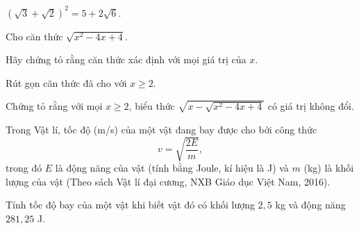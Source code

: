 \begin{exercises}
\begin{questions}[resume=SGK]
\begin{questions}
            \item $(\sqrt{3}+\sqrt{2})^2=5+2\sqrt{6}$.

            \answerline
            \answerline
        \end{questions}

        \item Cho căn thức $\sqrt{x^2-4x+4}$.
        \begin{questions}
            \item Hãy chứng tỏ rằng căn thức xác định với mọi giá trị của $x$.

            \answerline
            \answerline

            \item Rút gọn căn thức đã cho với $x\ge 2$.

            \answerline
            \answerline

            \item Chứng tỏ rằng với mọi $x\ge 2$, biểu thức $\sqrt{x-\sqrt{x^2-4x+4}}$ có giá trị không đổi.

            \answerline
            \answerline
        \end{questions}

        \item Trong Vật lí, tốc độ (m/s) của một vật đang bay được cho bởi công thức
        \[
            v=\sqrt{\dfrac{2E}{m}},
        \]
        trong đó $E$ là động năng của vật (tính bằng Joule, kí hiệu là J) và $m$ (kg) là khối lượng của vật (Theo sách Vật lí đại cương, NXB Giáo dục Việt Nam, 2016).

        Tính tốc độ bay của một vật khi biết vật đó có khối lượng $2{,}5$ kg và động năng $281{,}25$ J.

        \answerline
        \answerline
    \end{questions}
\end{exercises}
